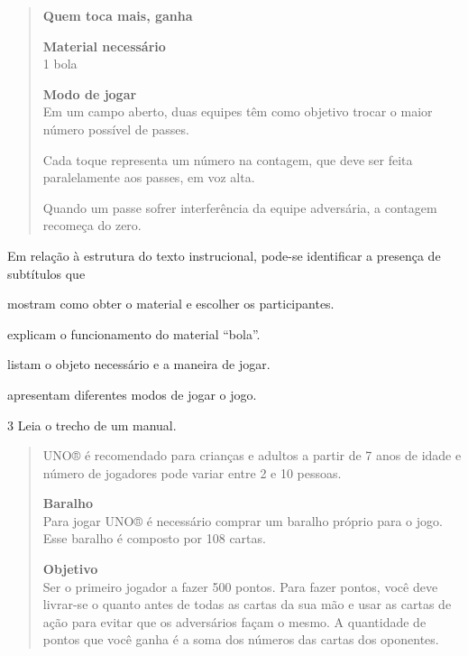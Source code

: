 \begin{quote}
\textbf{Quem toca mais, ganha}

\textbf{Material necessário}\\
1 bola

\textbf{Modo de jogar}\\
Em um campo aberto, duas equipes têm como
objetivo trocar o maior número possível de passes.

Cada toque representa um número na contagem, que deve ser feita
paralelamente aos passes, em voz alta.

Quando um passe sofrer interferência da equipe adversária, a contagem
recomeça do zero.

\end{quote}

Em relação à estrutura do texto instrucional, pode-se identificar a
presença de subtítulos que

\begin{escolha}
\item mostram como obter o material e escolher os participantes.

\item explicam o funcionamento do material ``bola''.

\item listam o objeto necessário e a maneira de jogar.

\item apresentam diferentes modos de jogar o jogo.
\end{escolha}

\pagebreak
\num{3} Leia o trecho de um manual.

\begin{quote}
UNO® é recomendado para crianças e adultos a partir de 7 anos de idade e número de jogadores pode variar entre 2 e 10 pessoas.

\textbf{Baralho}\\
Para jogar UNO® é necessário comprar um baralho próprio para o jogo. Esse baralho é composto por 108 cartas.

\textbf{Objetivo}\\
Ser o primeiro jogador a fazer 500 pontos. Para fazer pontos, você deve
livrar-se o quanto antes de todas as cartas da sua mão e usar as cartas 
de ação para evitar que os adversários façam o mesmo. A quantidade de 
pontos que você ganha é a soma dos números das cartas dos oponentes.

\end{quote}

